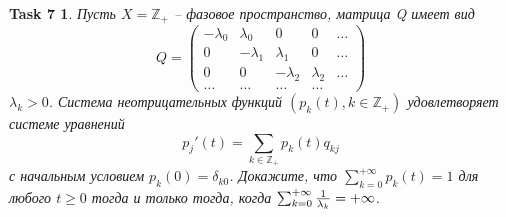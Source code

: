 \documentclass[12pt,a4paper]{extarticle}
\newtheorem*{task7}{Task 7}
\newcommand{\Z}{\mathbb{Z}}
\begin{document}
	\begin{task7}
		Пусть $X = \Z_+$ -- фазовое пространство, матрица Q имеет вид
		\[
			Q =
			\begin{pmatrix}
				 -\lambda_0 & \lambda_0 & 0 & 0 & \ldots
				 \\
				 0 & -\lambda_1 & \lambda_1 & 0 & \ldots
				 \\
				 0 & 0 & -\lambda_2 & \lambda_2 & \ldots
				 \\
				 \ldots & \ldots & \ldots & \ldots
			\end{pmatrix}
		\]
		$\lambda_k > 0$. Система неотрицательных функций $(p_k(t), k \in \Z_+)$ удовлетворяет системе уравнений
		\[
			p_j'(t) = \sum_{k \in \Z_+} p_k(t) q_{kj}
		\]
		с начальным условием $p_k(0) = \delta_{k0}$. Докажите, что $\sum_{k=0}^{+\infty}p_k(t) = 1$ для любого $t \geq 0$ тогда и только тогда, когда $\sum_{k=0}^{+\infty} {1 \over \lambda_k} = +\infty$.
		
	\end{task7}
\end{document}
